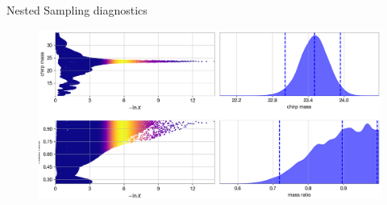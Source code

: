 \documentclass[
10pt,
aspectratio=169,
]{beamer}
\begin{document}
\begin{frame}{Nested Sampling diagnostics}
    \begin{figure}
        \centering
        \includegraphics[width=\textwidth]{GW150914_trace_def.png}
    \end{figure}
\end{frame}
\end{document}
